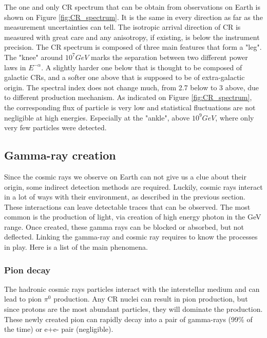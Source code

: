 The one and only CR spectrum that can be obtain from observations on Earth is shown on Figure \ref{fig:CR_spectrum}. It is the same in every direction as far as the measurement uncertainties can tell. The isotropic arrival direction of CR is measured with great care and any anisotropy, if existing, is below the instrument precision.
The CR spectrum is composed of three main features that form a "leg". The "knee" around $10^{7} GeV$ marks the separation between two different power laws in $E^{-\alpha}$. A slightly harder one below that is thought to be composed of galactic CRs, and a softer one above that is supposed to be of extra-galactic origin. The spectral index does not change much, from 2.7 below to 3 above, due to different production mechanism.
As indicated on Figure \ref{fig:CR_spectrum}, the corresponding flux of particle is very low and statistical fluctuations are not negligible at high energies. Especially at the "ankle", above $10^9 GeV$, where only very few particles were detected.


\subsection{Gamma-ray creation}

Since the cosmic rays we observe on Earth can not give us a clue about their origin, some indirect detection methods are required. Luckily, cosmic rays interact in a lot of ways with their environment, as described in the previous section. These interactions can leave detectable traces that can be observed. The most common is the production of light, via creation of high energy photon in the GeV range. Once created, these gamma rays can be blocked or absorbed, but not deflected. Linking the gamma-ray and cosmic ray requires to know the processes in play. Here is a list of the main phenomena.

\subsubsection{Pion decay}


The hadronic cosmic rays  particles interact with the interstellar medium and can lead to pion $\pi^0$ production. Any CR nuclei can result in pion production, but since protons are the most abundant particles, they will dominate the production. 
These newly created pion can rapidly decay into a pair of gamma-rays (99\% of the time) or e+e- pair (negligible).




